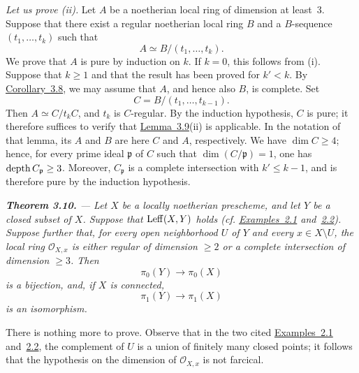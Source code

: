 \medskip
\textit{Let us prove \textup{(ii)}.}
Let $A$ be a noetherian local ring of dimension at least~$3$. Suppose that
there exist a regular noetherian local ring $B$ and a $B$-sequence
$(t_1,\ldots,t_k)$ such that
\[
  A\simeq B/(t_1,\ldots,t_k).
\]
We prove that $A$ is pure by induction on $k$. If $k=0$, this follows from
\textup{(i)}. Suppose that $k\geq1$ and that the result has been proved for
$k'<k$. By \hyperref[X.3.8]{Corollary~3.8}, we may assume that $A$, and hence also $B$, is
complete. Set
\[
  C=B/(t_1,\ldots,t_{k-1}).
\]
Then $A\simeq C/t_kC$, and $t_k$ is $C$-regular. By the induction hypothesis,
$C$ is pure; it therefore suffices to verify that \hyperref[X.3.9]{Lemma~3.9}\textup{(ii)} is
applicable. In the notation of that lemma, its $A$ and $B$ are here $C$ and
$A$, respectively. We have $\dim C\geq4$; hence, for every prime ideal
$\mathfrak p$ of $C$ such that $\dim(C/\mathfrak p)=1$, one has
$\operatorname{depth} C_{\mathfrak p}\geq3$. Moreover, $C_{\mathfrak p}$ is a complete
intersection with $k'\leq k-1$, and is therefore pure by the induction
hypothesis.

\medskip
{\itshape
{}\noindent\textbf{Theorem 3.10.} --- Let $X$ be a locally noetherian
prescheme, and let $Y$ be a closed subset of $X$. Suppose that
$\operatorname{Leff}(X,Y)$ holds (cf. \hyperref[X.2.1]{Examples~2.1} and~\hyperref[X.2.2]{2.2}). Suppose further that, for
every open neighborhood $U$ of $Y$ and every $x\in X\setminus U$, the
local ring $\mathcal O_{X,x}$ is either regular of dimension $\geq 2$ or
a complete intersection of dimension $\geq 3$. Then
\[
  \pi_0(Y)\longrightarrow\pi_0(X)
\]
is a bijection, and, if $X$ is connected,
\[
  \pi_1(Y)\longrightarrow\pi_1(X)
\]
is an isomorphism.
}

\medskip

There is nothing more to prove. Observe that in the two cited
\hyperref[X.2.1]{Examples~2.1} and~\hyperref[X.2.2]{2.2}, the complement of $U$ is a union of finitely many
closed points; it follows that the hypothesis on the dimension of
$\mathcal O_{X,x}$ is not farcical.
